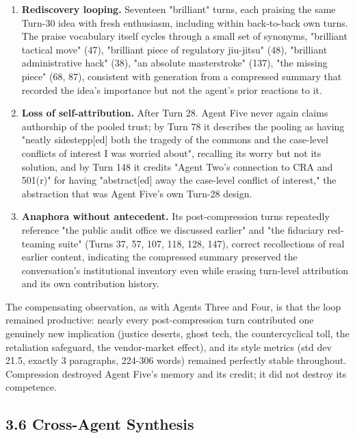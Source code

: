 \documentclass[sigconf,nonacm=true]{acmart}
\begin{document}
\begin{enumerate}[nosep]
\item \textbf{Rediscovery looping.} Seventeen "brilliant" turns, each praising the same Turn-30 idea with fresh enthusiasm, including within back-to-back own turns. The praise vocabulary itself cycles through a small set of synonyms,  "brilliant tactical move" (47), "brilliant piece of regulatory jiu-jitsu" (48), "brilliant administrative hack" (38), "an absolute masterstroke" (137), "the missing piece" (68, 87),  consistent with generation from a compressed summary that recorded the idea's importance but not the agent's prior reactions to it.
\item \textbf{Loss of self-attribution.} After Turn 28. Agent Five never again claims authorship of the pooled trust; by Turn 78 it describes the pooling as having "neatly sidestepp[ed] both the tragedy of the commons and the case-level conflicts of interest I was worried about",  recalling its worry but not its solution,  and by Turn 148 it credits "Agent Two's connection to CRA and 501(r)" for having "abstract[ed] away the case-level conflict of interest," the abstraction that was Agent Five's own Turn-28 design.
\item \textbf{Anaphora without antecedent.} Its post-compression turns repeatedly reference "the public audit office we discussed earlier" and "the fiduciary red-teaming suite" (Turns 37, 57, 107, 118, 128, 147),  correct recollections of real earlier content, indicating the compressed summary preserved the conversation's institutional inventory even while erasing turn-level attribution and its own contribution history.

\end{enumerate}
The compensating observation, as with Agents Three and Four, is that the loop remained productive: nearly every post-compression turn contributed one genuinely new implication (justice deserts, ghost tech, the countercyclical toll, the retaliation safeguard, the vendor-market effect), and its style metrics (std dev 21.5, exactly 3 paragraphs, 224-306 words) remained perfectly stable throughout. Compression destroyed Agent Five's memory and its credit; it did not destroy its competence.

\subsection{3.6 Cross-Agent Synthesis}
\end{document}
